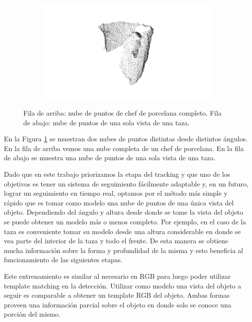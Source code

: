 \begin{figure}
\begin{subfigure}[b]{0.24\textwidth}
	\end{subfigure}
	\begin{subfigure}[b]{0.24\textwidth}
		\includegraphics[width=\textwidth]{img/ejemplos_nubes/taza_04.png}
	\end{subfigure}

	\caption{Fila de arriba: nube de puntos de chef de porcelana completo. Fila de abajo: nube de puntos de una sola vista de una taza.}
	\label{fig:nube_completa_vs_simple}
\end{figure}

En la Figura \ref{fig:nube_completa_vs_simple} se muestran dos nubes de puntos distintas desde distintos ángulos. En la fila de arriba vemos una nube completa de un chef de porcelana. En la fila de abajo se muestra una nube de puntos de una sola vista de una taza.

Dado que en este trabajo priorizamos la etapa del tracking y que uno de los objetivos es tener un sistema de seguimiento fácilmente adaptable y, en un futuro, lograr un seguimiento en tiempo real, optamos por el método más simple y rápido que es tomar como modelo una nube de puntos de una única vista del objeto. Dependiendo del ángulo y altura desde donde se tome la vista del objeto se puede obtener un modelo más o menos completo. Por ejemplo, en el caso de la taza es conveniente tomar su modelo desde una altura considerable en donde se vea parte del interior de la taza y todo el frente. De esta manera se obtiene mucha información sobre la forma y profundidad de la misma y esto beneficia al funcionamiento de las siguientes etapas.

Este entrenamiento es similar al necesario en RGB para luego poder utilizar template matching en la detección. Utilizar como modelo una vista del objeto a seguir es comparable a obtener un template RGB del objeto. Ambas formas proveen una información parcial sobre el objeto en donde solo se conoce una porción del mismo.

